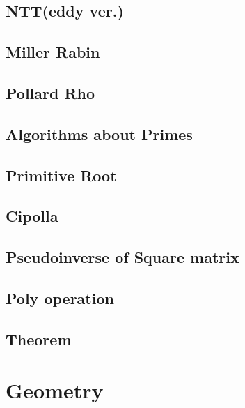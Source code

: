 \documentclass[a4paper,10pt,twocolumn,oneside]{article}
\begin{document}
\subsection{NTT(eddy ver.)}


\subsection{Miller Rabin}


\subsection{Pollard Rho}


\subsection{Algorithms about Primes}


\subsection{Primitive Root}


\subsection{Cipolla}


\subsection{Pseudoinverse of Square matrix}


\subsection{Poly operation}


\subsection{Theorem}



\section{Geometry}
\end{document}
